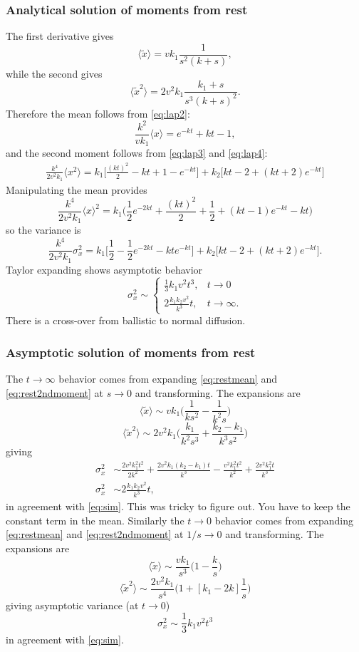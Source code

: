 \documentclass[11pt]{article}
\newcommand\be{\begin{equation}} %
\newcommand\ee{\end{equation}}   %
\newcommand\bra{\langle}
\newcommand\ket{\rangle}
\begin{document}
\subsubsection{Analytical solution of moments from rest}
The first derivative gives 
\be \bra \tilde{x} \ket = vk_1 \frac{1}{s^2(k+s)}, \label{eq:restmean}\ee
while the second gives 
\be \bra \tilde{x}^2 \ket = 2 v^2  k_1 \frac{k_1+s}{s^3(k+s)^2}. \label{eq:rest2ndmoment}\ee
Therefore the mean follows from \ref{eq:lap2}:
\be \frac{k^2}{vk_1} \bra x \ket = e^{-kt} + kt -1, \ee
and the second moment follows from \ref{eq:lap3} and \ref{eq:lap4}:
\begin{align}
\frac{k^4}{2v^2 k_1}\bra x^2 \ket = k_1\Big[\frac{(kt)^2}{2}-kt + 1 - e^{-kt}\Big] + k_2 \Big[kt -2 + (kt+2)e^{-kt}\Big]
\end{align}
Manipulating the mean provides 
\be \frac{k^4}{2v^2 k_1} \bra x \ket^2 = k_1 \Big(\frac{1}{2} e^{-2kt} + \frac{(kt)^2}{2} + \frac{1}{2} + (kt-1)e^{-kt} - kt\Big) \ee
so the variance is 
\be \frac{k^4}{2v^2 k_1}\sigma_x^2 = k_1 \Big[\frac{1}{2}-\frac{1}{2}e^{-2kt} - kt e^{-kt}\Big]  + k_2 \Big[kt -2 + (kt + 2)e^{-kt}\Big].\ee
Taylor expanding shows asymptotic behavior
\be \sigma_x^2 \sim 
\begin{cases}
	 \frac{1}{3}k_1v^2 t^3, & t\rightarrow 0 \\
	 2\frac{k_1k_2 v^2}{k^3} t, & t \rightarrow \infty.
\end{cases} \label{eq:sim}\ee
There is a cross-over from ballistic to normal diffusion.

\subsubsection{Asymptotic solution of moments from rest}
The $t\rightarrow \infty$ behavior comes from expanding \ref{eq:restmean} and \ref{eq:rest2ndmoment} at $s\rightarrow0$ and transforming. 
The expansions are 
\be \bra \tilde{x} \ket \sim vk_1 \Big( \frac{1}{ks^2} - \frac{1}{k^2 s}\Big)\ee
\be \bra \tilde{x}^2 \ket \sim 2v^2k_1\Big(\frac{k_1}{k^2s^3} + \frac{k_2-k_1}{k^3s^2}\Big)\ee
giving 
\begin{align} \sigma_x^2 &\sim  \frac{2v^2k_1^2 t^2}{2k^2} + \frac{2v^2k_1(k_2-k_1)t}{k^3}  - \frac{v^2k_1^2 t^2}{k^2} + \frac{2v^2k_1^2t}{k^3} \\ \sigma_x^2&\sim 2\frac{k_1k_2 v^2}{k^3} t,\end{align}
in agreement with \ref{eq:sim}. This was tricky to figure out. You have to keep the constant term in the mean.
Similarly the $t\rightarrow 0$ behavior comes from expanding  \ref{eq:restmean} and \ref{eq:rest2ndmoment} at $1/s\rightarrow0$ and transforming.
The expansions are 
\be \bra \tilde{x} \ket \sim  \frac{vk_1}{s^3}\Big(1-\frac{k}{s}\Big)\ee
\be \bra \tilde{x}^2 \ket \sim \frac{2v^2k_1}{s^4}\Big(1+ [k_1-2k]\frac{1}{s}\Big)\ee
giving asymptotic variance (at $t\rightarrow 0$)
\be \sigma_x^2 \sim \frac{1}{3}k_1v^2 t^3 \ee
in agreement with  \ref{eq:sim}.
\end{document}
